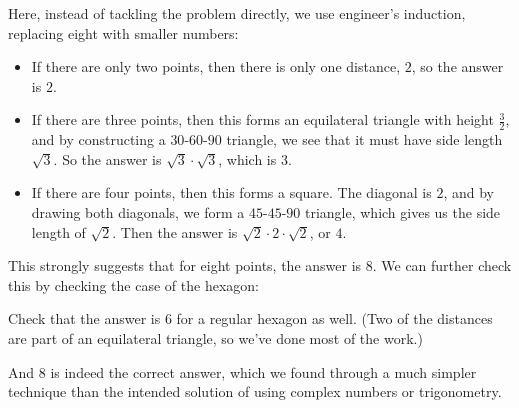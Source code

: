 \documentclass[11pt,paper=letter]{scrartcl}
\begin{document}
Here, instead of tackling the problem directly, we use engineer's induction, replacing eight with smaller numbers:
\begin{itemize}
  \item If there are only two points, then there is only one distance, $2$, so the answer is $2$.
  \item If there are three points, then this forms an equilateral triangle with height $\frac{3}{2}$, and by constructing a $30$-$60$-$90$ triangle, we see that it must have side length $\sqrt{3}$. So the answer is $\sqrt{3} \cdot \sqrt{3}$, which is $3$.
  \item If there are four points, then this forms a square. The diagonal is $2$, and by drawing both diagonals, we form a $45$-$45$-$90$ triangle, which gives us the side length of $\sqrt{2}$. Then the answer is $\sqrt{2} \cdot 2 \cdot \sqrt{2}$, or $4$.
\end{itemize}
This strongly suggests that for eight points, the answer is $8$. We can further check this by checking the case of the hexagon:
\begin{exrboxed}
  Check that the answer is $6$ for a regular hexagon as well. (Two of the distances are part of an equilateral triangle, so we've done most of the work.)
\end{exrboxed}
And $8$ is indeed the correct answer, which we found through a much simpler technique than the intended solution of using complex numbers or trigonometry.
\end{document}
